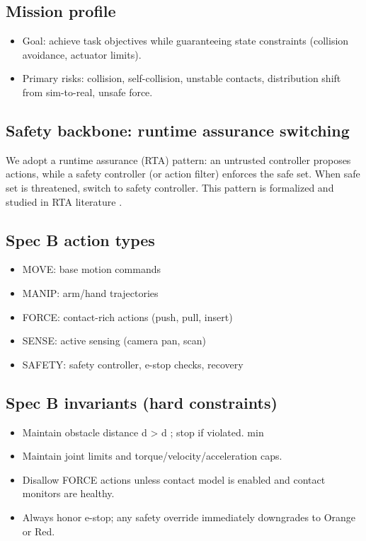 \documentclass[11pt]{article}
\begin{document}
\subsection{Mission profile}
\begin{itemize}
\item 
Goal: achieve task objectives while guaranteeing state constraints (collision avoidance, actuator
limits).
\item 
Primary risks: collision, self-collision, unstable contacts, distribution shift from sim-to-real,
unsafe force.
\end{itemize}
\subsection{Safety backbone: runtime assurance switching}
We adopt a runtime assurance (RTA) pattern: an untrusted controller proposes actions, while a
safety controller (or action filter) enforces the safe set. When safe set is threatened, switch to safety
controller. This pattern is formalized and studied in RTA literature \citep{miller2024rta_rl_iccps}.
\subsection{Spec B action types}
\begin{itemize}
\item 
MOVE: base motion commands
\item 
MANIP: arm/hand trajectories
\item 
FORCE: contact-rich actions (push, pull, insert)
\item 
SENSE: active sensing (camera pan, scan)
\item 
SAFETY: safety controller, e-stop checks, recovery
\end{itemize}
\subsection{Spec B invariants (hard constraints)}
\begin{itemize}
\item 
Maintain obstacle distance d > d ; stop if violated.
min
\item 
Maintain joint limits and torque/velocity/acceleration caps.
\item 
Disallow FORCE actions unless contact model is enabled and contact monitors are healthy.
\item 
Always honor e-stop; any safety override immediately downgrades to Orange or Red.
\end{itemize}
\end{document}
